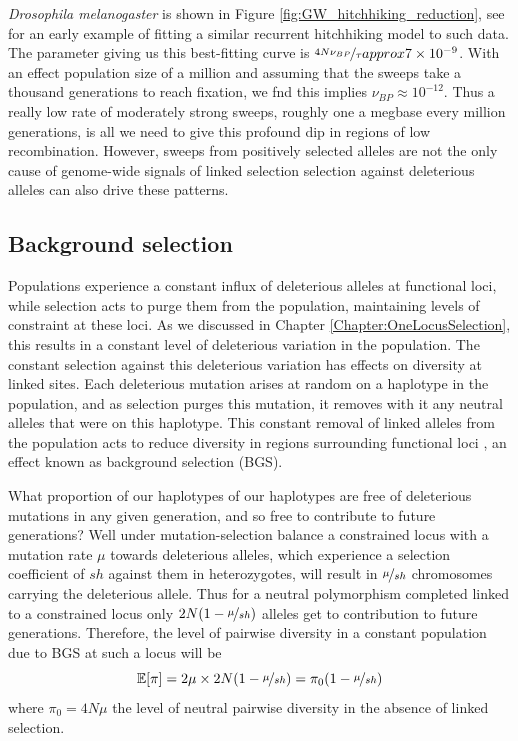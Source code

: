 {\it Drosophila melanogaster} is shown in Figure
\ref{fig:GW_hitchhiking_reduction}, see \citet{wiehe1993analysis} for
an early example of fitting a similar recurrent hitchhiking model to such data. The parameter giving us this
best-fitting curve is $\nicefrac{4N\nu_{BP}}{ \tau} approx 7 \times 10^{-9}$. With an
  effect population size of a million  and assuming that the sweeps take
  a thousand generations to reach fixation, we fnd this implies
  $\nu_{BP} \approx 10^{-12}$. Thus a really low rate of
  moderately strong sweeps, roughly one a megbase every million
  generations,  is all we need to give this profound dip in regions
  of low recombination. However, sweeps from positively selected
  alleles are not the only cause of genome-wide signals of linked
  selection selection against deleterious alleles can also drive these
  patterns.    

\subsection{Background selection}

Populations experience a constant influx of
deleterious alleles at functional loci, while selection acts to purge
them from the population, maintaining levels of constraint at these loci. As
we discussed in Chapter \ref{Chapter:OneLocusSelection}, this results
in a constant level of deleterious variation in the population. The
constant selection against this deleterious variation has effects on diversity at linked
sites. Each deleterious mutation arises at random on a haplotype in the
population, and as selection purges this mutation, it removes with it any neutral alleles that were on this
haplotype. This constant removal of linked alleles from the population
acts to reduce diversity in regions surrounding functional loci
\citep{Hudson:95b,Nordborg:96}, an effect known as background
selection (BGS).

What proportion of our haplotypes of our haplotypes are free of
deleterious mutations in any given generation, and so free to
contribute to future generations? Well under mutation-selection
balance a constrained locus with a mutation rate $\mu$ towards
deleterious alleles, which experience a selection coefficient of $sh$
against them in heterozygotes, will result in $\nicefrac{\mu}{sh}$
chromosomes carrying the deleterious allele. Thus for a neutral polymorphism
completed linked to a constrained locus only
$2N(1-\nicefrac{\mu}{sh})$ alleles get to contribution to future
generations. Therefore, the level of pairwise diversity in a constant
population due to BGS at such a locus will be
\begin{equation}
\mathbb{E}[\pi] = 2 \mu \times 2N(1-\nicefrac{\mu}{sh}) = \pi_0  (1-\nicefrac{\mu}{sh})
\end{equation}
where $\pi_0= 4N\mu$ the level of neutral pairwise diversity in the
absence of linked selection.

